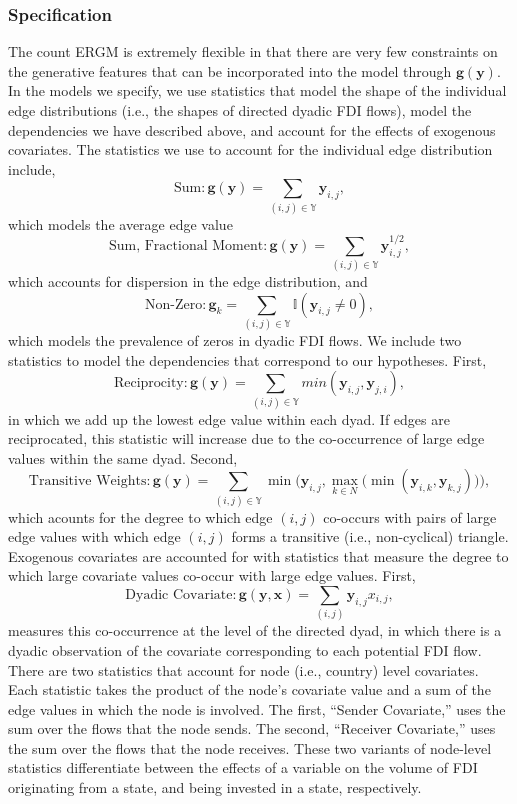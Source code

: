 \documentclass[reqno,onecolumn,letterpaper,12pt]{article}
\begin{document}
\subsubsection{Specification}


The count ERGM is extremely flexible in that there are very few constraints on the generative features that can be incorporated into the model through $\bm{g}( \bm{y} )$. In the models we specify, we use statistics that model the shape of the individual edge distributions (i.e., the shapes of directed dyadic FDI flows), model the dependencies we have described above, and account for the effects of exogenous covariates. The statistics we use to account for the individual edge distribution include, $$\text{Sum}:\bm{g(y)} = \sum_{(i,j) {\in} \mathbb{Y}}\bm{y}_{i,j},$$ which models the average edge value $$\text{Sum, Fractional Moment}:\bm{g(y)} = \sum_{(i,j) {\in} \mathbb{Y}}\bm{y}_{i,j}^{1/2},$$ which accounts for dispersion in the edge distribution, and
$$\text{Non-Zero}: \bm{g}_k = \sum_{(i,j) {\in} \mathbb{Y}} \mathbb{I}(\bm{y}_{i,j} \neq 0),$$ which models the prevalence of zeros in dyadic FDI flows. We include two statistics to model the dependencies that correspond to our hypotheses. First,
$$ \text{Reciprocity}: \bm{g(y)} = \sum_{(i,j) {\in} \mathbb{Y}}min(\bm{y}_{i,j},\bm{y}_{j,i}),$$ in which we add up the lowest edge value within each dyad. If edges are reciprocated, this statistic will increase due to the co-occurrence of large edge values within the same dyad. Second,
$$\text{Transitive Weights}: \bm{g(y)} =  \sum_{(i,j) {\in} \mathbb{Y}}\min\bigg( \bm{y}_{i,j}, \max\limits_{k{\in}N}\Big(\min(\bm{y}_{i,k},\bm{y}_{k,j})\Big) \bigg),$$ which acounts for the degree to which edge $(i,j)$ co-occurs with pairs of large edge values with which  edge $(i,j)$ forms a transitive (i.e., non-cyclical) triangle. Exogenous covariates are accounted for with statistics that measure the degree to which large covariate values co-occur with large edge values. First,
$$ \text{Dyadic Covariate}: \bm{g(y,x)} = \sum_{(i,j)} \bm{y}_{i,j}x_{i,j},$$ measures this co-occurrence at the level of the directed dyad, in which there is a dyadic observation of the covariate corresponding to each potential FDI flow. There are two statistics that account for node (i.e., country) level covariates. Each statistic takes the product of the node's covariate value and a sum of the edge values in which the node is involved. The first, ``Sender Covariate,'' uses the sum over the flows that the node sends. The second, ``Receiver Covariate,'' uses the sum over the flows that the node receives. These two variants of node-level statistics differentiate between the effects of a variable on the volume of FDI originating from a state, and being invested in a state, respectively.
\end{document}

